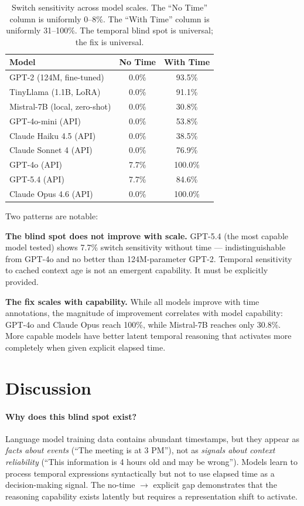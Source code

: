\documentclass[11pt,a4paper]{article}
\begin{document}
\begin{table}[h]
\centering
\caption{Switch sensitivity across model scales. The ``No Time'' column is uniformly 0--8\%. The ``With Time'' column is uniformly 31--100\%. The temporal blind spot is universal; the fix is universal.}
\label{tab:cross}
\begin{tabular}{lcc}
\toprule
\textbf{Model} & \textbf{No Time} & \textbf{With Time} \\
\midrule
GPT-2 (124M, fine-tuned) & 0.0\% & 93.5\% \\
TinyLlama (1.1B, LoRA) & 0.0\% & 91.1\% \\
Mistral-7B (local, zero-shot) & 0.0\% & 30.8\% \\
GPT-4o-mini (API) & 0.0\% & 53.8\% \\
Claude Haiku 4.5 (API) & 0.0\% & 38.5\% \\
Claude Sonnet 4 (API) & 0.0\% & 76.9\% \\
GPT-4o (API) & 7.7\% & 100.0\% \\
GPT-5.4 (API) & 7.7\% & 84.6\% \\
Claude Opus 4.6 (API) & 0.0\% & 100.0\% \\
\bottomrule
\end{tabular}
\end{table}

Two patterns are notable:

\textbf{The blind spot does not improve with scale.}
GPT-5.4 (the most capable model tested) shows 7.7\% switch sensitivity without time --- indistinguishable from GPT-4o and no better than 124M-parameter GPT-2.
Temporal sensitivity to cached context age is not an emergent capability.
It must be explicitly provided.

\textbf{The fix scales with capability.}
While all models improve with time annotations, the magnitude of improvement correlates with model capability: GPT-4o and Claude Opus reach 100\%, while Mistral-7B reaches only 30.8\%.
More capable models have better latent temporal reasoning that activates more completely when given explicit elapsed time.

\section{Discussion}
\label{sec:discussion}

\paragraph{Why does this blind spot exist?}
Language model training data contains abundant timestamps, but they appear as \emph{facts about events} (``The meeting is at 3 PM''), not as \emph{signals about context reliability} (``This information is 4 hours old and may be wrong'').
Models learn to process temporal expressions syntactically but not to use elapsed time as a decision-making signal.
The no-time $\to$ explicit gap demonstrates that the reasoning capability exists latently but requires a representation shift to activate.
\end{document}

